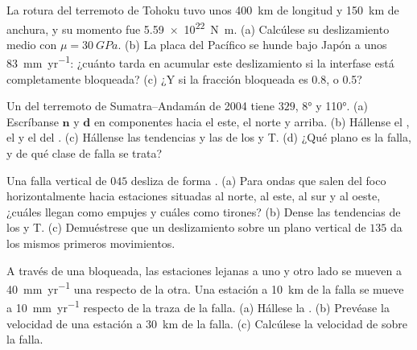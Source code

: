 \begin{exercise}[$\star\star$]\label{exo:b1:earthquake-source:6}
La rotura del terremoto de Tohoku tuvo unos \qty{400}{km} de longitud y \qty{150}{km} de anchura, y su momento fue \qty{5.59e22}{N.m}.
(a) Calcúlese su deslizamiento medio con $\mu = \qty{30}{GPa}$. (b) La placa del Pacífico se hunde bajo Japón a unos \qty{83}{mm.yr^{-1}}:
¿cuánto tarda en acumular este deslizamiento si la interfase está completamente bloqueada? (c) ¿Y si la fracción bloqueada es 0.8, o 0.5?
\end{exercise}

\begin{exercise}[$\star\star$]\label{exo:b1:earthquake-source:7}
Un  del terremoto de Sumatra--Andamán de 2004 tiene  $329$,  \ang{8} y  \ang{110}. (a) Escríbanse
$\mathbf n$ y $\mathbf d$ en componentes hacia el este, el norte y arriba. (b) Hállense el , el  y el  del .
(c) Hállense las tendencias y las  de los  y T. (d) ¿Qué plano es la falla, y de qué clase de falla se trata?
\end{exercise}

\begin{exercise}[$\star\star$]\label{exo:b1:earthquake-source:8}
Una falla vertical de  $045$ desliza de forma . (a) Para ondas que salen del foco horizontalmente hacia estaciones situadas al
norte, al este, al sur y al oeste, ¿cuáles llegan como empujes y cuáles como tirones? (b) Dense las tendencias de los  y T. (c) Demuéstrese
que un deslizamiento  sobre un plano vertical de  $135$ da los mismos primeros movimientos.
\end{exercise}

\begin{exercise}[$\star\star$]\label{exo:b1:earthquake-source:9}
A través de una  bloqueada, las estaciones lejanas a uno y otro lado se mueven a \qty{40}{mm.yr^{-1}} una respecto de la otra.
Una estación a \qty{10}{km} de la falla se mueve a \qty{10}{mm.yr^{-1}} respecto de la traza de la falla. (a) Hállese la .
(b) Prevéase la velocidad de una estación a \qty{30}{km} de la falla. (c) Calcúlese la velocidad de  sobre la falla.
\end{exercise}


